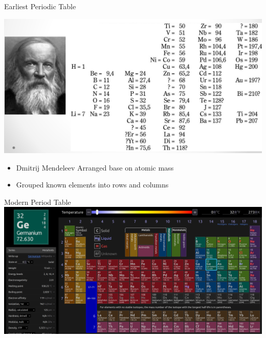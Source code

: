\documentclass[11pt]{beamer}
\begin{document}
\begin{frame}{Earliest Periodic Table}
  \begin{center}
    \includegraphics[scale=0.13]{mendeleev_table}
  \end{center}
  
  \begin{itemize}
  \item Dmitrij Mendeleev Arranged base on atomic mass
  \item Grouped known elements into rows and columns
  \end{itemize}
\end{frame}

\begin{frame}{Modern Period Table}
  \centering
  \includegraphics[width=\linewidth]{ptable}
\end{frame}
\end{document}
